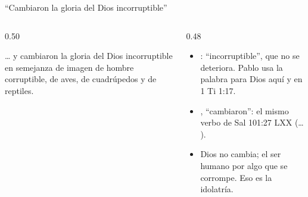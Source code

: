 \begin{frame}{``Cambiaron la gloria del Dios incorruptible''}
\begin{columns}[t,onlytextwidth]
\begin{column}{0.50\textwidth}
\begin{cita}\ldots{} y cambiaron la gloria del Dios incorruptible en semejanza de imagen de hombre corruptible, de aves, de cuadrúpedos y de reptiles.\end{cita}
\begin{center}\end{center}
\end{column}
\begin{column}{0.48\textwidth}\small
\begin{itemize}
\item {}: ``incorruptible'', que no se deteriora. Pablo usa la palabra para Dios aquí y en 1 Ti 1:17.
\item {}, ``cambiaron'': el mismo verbo de Sal 101:27 LXX (\ldots{} ).
\item Dios no cambia; el ser humano  por algo que se corrompe. Eso es la idolatría.
\end{itemize}
\end{column}
\end{columns}
\end{frame}

